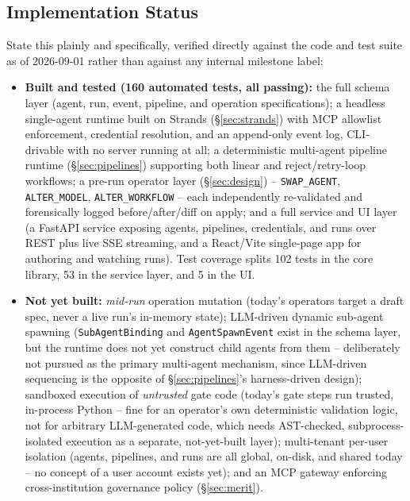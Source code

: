 \documentclass[10pt,conference]{IEEEtran}
\begin{document}
\subsection{Implementation Status}
\label{sec:status}
State this plainly and specifically, verified directly against the code and
test suite as of 2026-09-01 rather than against any internal milestone
label:
\begin{itemize}
  \item \textbf{Built and tested (160 automated tests, all passing):} the
  full schema layer (agent, run, event, pipeline, and operation
  specifications); a headless single-agent runtime built on Strands
  (\S\ref{sec:strands}) with MCP allowlist enforcement, credential
  resolution, and an append-only event log, CLI-drivable with no server
  running at all; a deterministic multi-agent pipeline runtime
  (\S\ref{sec:pipelines}) supporting both linear and reject/retry-loop
  workflows; a pre-run operator layer (\S\ref{sec:design}) --
  \texttt{SWAP\_AGENT}, \texttt{ALTER\_MODEL}, \texttt{ALTER\_WORKFLOW} --
  each independently re-validated and forensically logged before/after/diff
  on apply; and a full service and UI layer (a FastAPI service exposing
  agents, pipelines, credentials, and runs over REST plus live SSE
  streaming, and a React/Vite single-page app for authoring and watching
  runs). Test coverage splits 102 tests in the core library, 53 in the
  service layer, and 5 in the UI.
  \item \textbf{Not yet built:} \emph{mid-run} operation mutation (today's
  operators target a draft spec, never a live run's in-memory state);
  LLM-driven dynamic sub-agent spawning (\texttt{SubAgentBinding} and
  \texttt{AgentSpawnEvent} exist in the schema layer, but the runtime does
  not yet construct child agents from them -- deliberately not pursued as
  the primary multi-agent mechanism, since LLM-driven sequencing is the
  opposite of \S\ref{sec:pipelines}'s harness-driven design); sandboxed
  execution of \emph{untrusted} gate code (today's gate steps run trusted,
  in-process Python -- fine for an operator's own deterministic validation
  logic, not for arbitrary LLM-generated code, which needs AST-checked,
  subprocess-isolated execution as a separate, not-yet-built layer);
  multi-tenant per-user isolation (agents, pipelines, and runs are all
  global, on-disk, and shared today -- no concept of a user account
  exists yet); and an MCP gateway enforcing cross-institution governance
  policy (\S\ref{sec:merit}).
\end{itemize}
\end{document}
